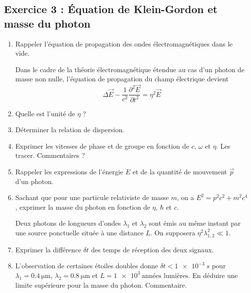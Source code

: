 \subsection{Exercice 3 : Équation de Klein-Gordon et masse du photon}

\begin{enumerate}
	\item Rappeler l'équation de propagation des ondes électromagnétiques dans le vide.
	
	Dans le cadre de la théorie électromagnétique étendue au cas d'un photon de masse non nulle, l'équation de propagation du champ électrique devient $$\Delta \vec{E} - \frac{1}{c^2} \frac{\partial^2 \vec{E}}{\partial t^2} = \eta^2 \vec{E}$$
	
	\item Quelle est l'unité de $\eta$ ?
	\item Déterminer la relation de dispersion.
	\item Exprimer les vitesses de phase et de groupe en fonction de $c$, $\omega$ et $\eta$. Les tracer. Commentaires ?
	\item Rappeler les expressions de l'énergie $E$ et de la quantité de mouvement $\vec{p}$ d'un photon.
	\item Sachant que pour une particule relativiste de masse $m$, on a $E^2 = p^2 c^2 + m^2 c^4$, exprimer la masse du photon en fonction de $\eta$, $\hbar$ et $c$.
	
	Deux photons de longueurs d'ondes $\lambda_1$ et $\lambda_2$ sont émis au même instant par une source ponctuelle située à une distance $L$. On supposera $\eta^2 \lambda_{1, 2}^2 \ll 1$.
	
	\item Exprimer la différence $\delta t$ des temps de réception des deux signaux.
	
	\item L'observation de certaines étoiles doubles donne $\delta t < \SI{1e-3}{s}$ pour $\lambda_1 = \SI{0.4}{\micro\meter}$, $\lambda_2 = \SI{0.8}{\micro\meter}$ et $L = \SI{1e3}{\textrm{années lumières}}$. En déduire une limite supérieure pour la masse du photon. Commentaire.
	
\end{enumerate}